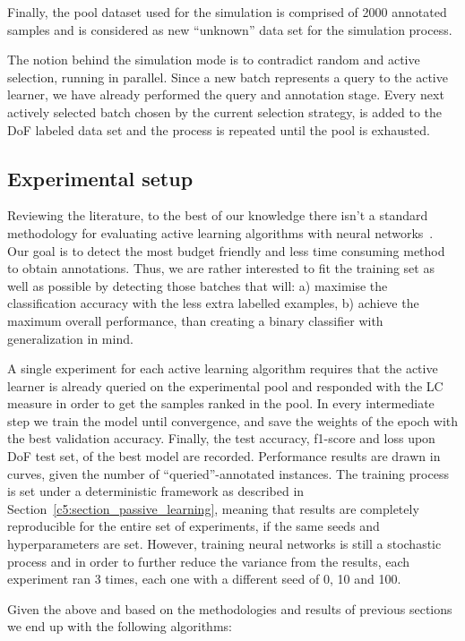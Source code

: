 Finally, the pool dataset used for the simulation is comprised of 2000 annotated samples and is considered as new ``unknown'' data set for the simulation process.

The notion behind the simulation mode is to contradict random and active selection, running in parallel. Since a new batch represents a query to the active learner, we have already performed the query and annotation stage. Every next actively selected batch chosen by the current selection strategy, is added to the DoF labeled data set and the process is repeated until the pool is exhausted.


\subsection{Experimental setup}
\label{c5:section_experimental_setup}
Reviewing the literature, to the best of our knowledge there isn't a standard methodology for evaluating active learning algorithms with neural networks~\cite{gissin2019discriminative}. Our goal is to detect the most budget friendly and less time consuming method to obtain annotations. Thus, we are rather interested to fit the training set as well as possible by detecting those batches that will: a) maximise the classification accuracy with the less extra labelled examples, b) achieve the maximum overall performance, than creating a binary classifier with generalization in mind.

A single experiment for each active learning algorithm requires that the active learner is already queried on the experimental pool and responded with the LC measure in order to get the samples ranked in the pool.
In every intermediate step we train the model until convergence, and save the weights of the epoch with the best validation accuracy.
Finally, the test accuracy, f1-score and loss upon DoF test set, of the best model are recorded.
Performance results are drawn in curves, given the number of ``queried''-annotated instances.
The training process is set under a deterministic framework as described in Section~\ref{c5:section_passive_learning}, meaning that results are completely reproducible for the entire set of experiments, if the same seeds and hyperparameters are set.
However, training neural networks is still a stochastic process and in order to further reduce the variance from the results, each experiment ran 3 times, each one with a different seed of 0, 10 and 100.

Given the above and based on the methodologies and results of previous sections we end up with the following algorithms:

